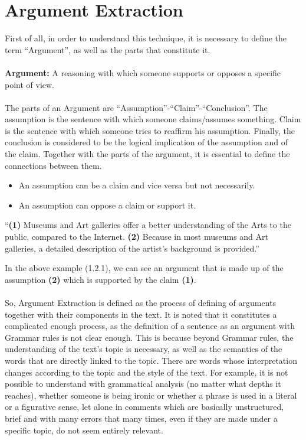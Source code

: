 \section{Argument Extraction}
First of all, in order to understand this technique, it is necessary to define the term ``Argument'', as well as the parts that constitute it.\\
\\
\textbf{Argument:} A reasoning with which someone supports or opposes a specific point of view.\\
\\
The parts of an Argument are ``Assumption''-``Claim''-``Conclusion''. The assumption is the sentence with which someone claims/assumes something. Claim is the sentence with which someone tries to reaffirm his assumption. Finally, the conclusion is considered to be the logical implication of the assumption and of the claim. Together with the parts of the argument, it is essential to define the connections between them.\\
\begin{itemize}

	\item An assumption can be a claim and vice versa but not necessarily.
	\item An assumption can oppose a claim or support it.\\

\end{itemize}

\begin{example}
``\textbf{(1)} Museums and Art galleries offer a better understanding of the Arts to the public, compared to the Internet. \textbf{(2)} Because in most museums and Art galleries, a detailed description of the artist's background is provided.''\\
\end{example}

In the above example (1.2.1), we can see an argument that is made up of the assumption \textbf{(2)} which is supported by the claim \textbf{(1)}.\\
\\
So, Argument Extraction is defined as the process of defining of arguments together with their components in the text. It is noted that it constitutes a complicated enough process, as the definition of a sentence as an argument with Grammar rules is not clear enough. This is because beyond Grammar rules, the understanding of the text's topic is necessary, as well as the semantics of the words that are directly linked to the topic. There are words whose interpretation changes according to the topic and the style of the text. For example, it is not possible to understand with grammatical analysis (no matter what depths it reaches), whether someone is being ironic or whether a phrase is used in a literal or a figurative sense, let alone in comments which are basically unstructured, brief and with many errors that many times, even if they are made under a specific topic, do not seem entirely relevant.

